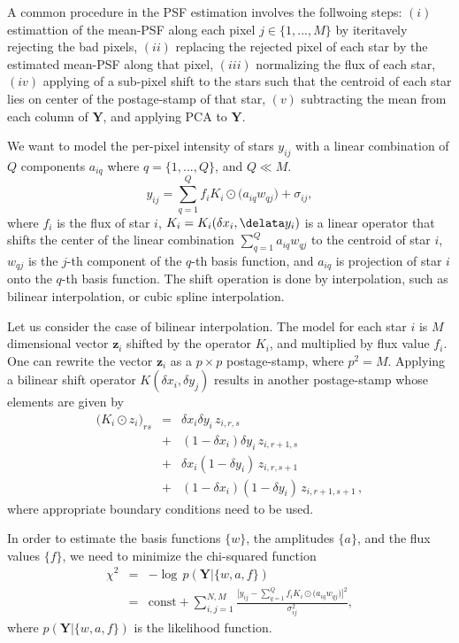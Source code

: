 \documentclass[12pt, preprint]{aastex}
\newcommand{\beq}{\begin{equation}}
\newcommand{\eeq}{\end{equation}}
\begin{document}
A common procedure in the PSF estimation involves the follwoing steps:
$(i)$ estimattion of the mean-PSF along each pixel $j\in\{1,...,M\}$
by iteritavely rejecting the bad pixels, $(ii)$ replacing the rejected
pixel of each star by the estimated mean-PSF along that pixel, $(iii)$ 
normalizing the flux of each star, $(iv)$ applying of a sub-pixel shift
to the stars such that the centroid of each star lies on center 
of the postage-stamp of that star, $(v)$ subtracting the mean from each
column of $\mathbf{Y}$, and applying PCA to $\mathbf{Y}$.

We want to model the per-pixel intensity of stars $y_{ij}$ with
a linear combination of $Q$ components $a_{iq}$ where $q=\{1,...,Q\}$, and $Q\ll M$.
\beq
y_{ij} = \sum_{q=1}^{Q} f_{i}K_{i}\odot\big(a_{iq}w_{qj}\big) + \sigma_{ij},
\eeq
where $f_{i}$ is the flux of star $i$, $K_{i} = K_{i}(\delta x_{i} , \delata y_{i})$
is a linear operator that shifts the center of the linear combination
$\sum_{q=1}^{Q}a_{iq}w_{qj}$ to the centroid of star $i$, $w_{qj}$ is the 
$j$-th component of the $q$-th basis function, and $a_{iq}$ is projection
of star $i$ onto the $q$-th basis function. The shift
operation is done by interpolation, such as bilinear interpolation,
or cubic spline interpolation. 

Let us consider the case of bilinear interpolation. The model for each
star $i$ is $M$ dimensional vector $\mathbf{z}_{i}$ shifted by the operator $K_{i}$,
and multiplied by flux value $f_{i}$. One can rewrite the vector $\mathbf{z}_{i}$
as a $p\times p$ postage-stamp, where $p^{2}=M$. Applying a bilinear shift
operator $K(\delta x_{i} , \delta y_{j})$ results in another postage-stamp whose elements are given by
\begin{eqnarray}
\big(K_{i}\odot z_{i}\big)_{rs} &=& \delta x_{i} \delta y_{i} \, z_{i,r,s} \nonumber \\
                                &+& (1 - \delta x_{i}) \delta y_{i} \, z_{i,r+1,s} \nonumber \\ 
                                &+& \delta x_{i} (1-\delta y_{i}) \, z_{i,r,s+1} \nonumber \\ 
                                &+& (1 - \delta x_{i})(1-\delta y_{i}) \, z_{i,r+1,s+1} \, ,
\end{eqnarray}
where appropriate boundary conditions need to be used. 

In order to estimate the basis functions $\{w\}$, the amplitudes $\{a\}$,
and the flux values $\{f\}$, we need to minimize the chi-squared function
\begin{eqnarray}
\chi^{2} &=& - \log \, p(\mathbf{Y}|\{w,a,f\}) \\
         &=& \text{const} + \sum_{i,j=1}^{N,M} \frac{\Big[y_{ij} - 
             \sum_{q=1}^{Q} f_{i}K_{i}\odot\big(a_{iq}w_{qj}\big)\Big]^{2}}{\sigma_{ij}^{2}},
\end{eqnarray}
where $p(\mathbf{Y}|\{w,a,f\})$ is the likelihood function.
\end{document}
